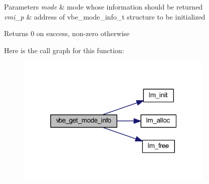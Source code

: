 \begin{DoxyParams}{Parameters}
{\em mode} & mode whose information should be returned \\
\hline
{\em vmi\+\_\+p} & address of vbe\+\_\+mode\+\_\+info\+\_\+t structure to be initialized \\
\hline
\end{DoxyParams}
\begin{DoxyReturn}{Returns}
0 on success, non-\/zero otherwise 
\end{DoxyReturn}
Here is the call graph for this function\+:
\nopagebreak
\begin{figure}[H]
\begin{center}
\leavevmode
\includegraphics[width=268pt]{group__vbe_ga4ef3234e41f2050bc094a22049b69e45_cgraph}
\end{center}
\end{figure}
